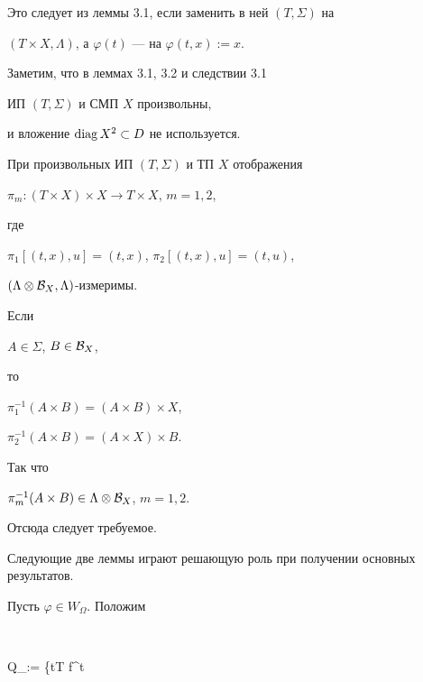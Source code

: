 \begin{pf} Это следует из леммы 3.1, если заменить в ней $(T,\Sigma)$ на


$(T\times X,\Lambda)$, а $\varphi(t)$ --- на $\varphi(t,x):=x$.


\end{pf}





Заметим, что в леммах 3.1, 3.2 и следствии 3.1


ИП $(T,\Sigma)$ и СМП $X$ произвольны,


и вложение $\operatorname{diag} X^2\subset D$ не используется.





\begin{lems} При произвольных ИП $(T,\Sigma)$ и ТП $X$ отображения


$\pi_m:(T\times X)\times X\to T\times X$, $m=1,2$,


где


$\pi_1[(t,x),u]=(t,x)$, $\pi_2[(t,x),u]=(t,u)$, \;


$(\Lambda\otimes{\cal B}_X,\Lambda)$-измеримы.


\end{lems}





\begin{pf} Если


$A\in\Sigma$, $B\in{\cal B}_X$,


то


$\pi_1^{-1}(A\times B)=(A\times B)\times X$, 


$\pi_2^{-1}(A\times B)=(A\times X)\times B$.


Так что


$\pi_m^{-1}(A\times B)\in\Lambda\otimes{\cal B}_X$, $m=1,2$.


Отсюда следует требуемое.


\end{pf}





Следующие две леммы играют решающую роль при получении основных результатов.





Пусть $\varphi\in W_\Omega$. Положим


$$


Q_\varphi := \{t\in T\mid {} f^t \;


